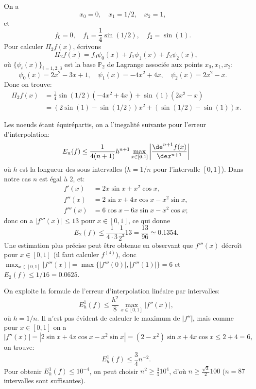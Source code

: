 \documentclass[11pt]{article}
\begin{document}
\newpage
\begin{Answer}[ref={ex:4}]
  \Question
On a
$$
x_0 = 0, \quad
x_1 = 1/2, \quad
x_2 = 1, \quad
$$
et
$$
f_0 = 0, \quad
f_1 = \frac{1}{4} \sin(1/2), \quad
f_2 = \sin(1). \quad
$$
Pour calculer $\Pi_2f(x)$, \'ecrivons
$$
\Pi_2 f(x) = f_0 \psi_0(x) + f_1 \psi_1(x) + f_2 \psi_2(x),
$$
o\`u $\{ \psi_i(x) \}_{i=1,2,3}$ est la base $\mathbb{P}_2$ de Lagrange
associ\'ee aux points $x_0, x_1, x_2$:
$$
\psi_0(x) = 2x^2 - 3x +1, \quad
\psi_1(x) = - 4x^2 + 4x, \quad
\psi_2(x) = 2x^2 - x. \quad
$$
Donc on trouve:
\begin{displaymath}
\begin{split}
\Pi_2 f(x) & = \frac{1}{4} \sin(1/2) (- 4x^2 + 4x) +
\sin(1) (2x^2 - x) \\
  & = (2 \sin(1) - \sin(1/2)) x^2 + (\sin(1/2) - \sin(1)) x.
\end{split}
\end{displaymath}

\Question
Les noeuds \'etant \'equir\'epartis, on a
l'inegalit\'e suivante pour l'erreur d'interpolation:
$$
E_n(f) \leq \frac{1}{4(n+1)} h^{n+1} \max_{x \in [0,1]} \left|
\frac{\de^{n+1} f(x)}{\de x^{n+1}} \right|
$$
o\`u $h$ est la longueur des sous-intervalles ($h= 1/n$
pour l'intervalle $[0,1]$).
Dans notre cas $n$ est \'egal \`a 2, et:
\begin{align*}
f'(x) & = 2 x \sin x + x^2 \cos x, \\
f''(x) & = 2 \sin x + 4 x \cos x - x^2 \sin x, \\
f'''(x) & = 6 \cos x - 6 x \sin x - x^2 \cos x;
\end{align*}
donc on a $|f'''(x)| \leq 13$ pour $x\in [0,1]$, ce qui donne
$$
E_2(f) \leq \frac{1}{4 \cdot 3} \frac{1}{2^3} 13 = \frac{13}{96} \simeq 0.1354.
$$
Une estimation plus pr\'ecise peut \^etre obtenue en observant que $f'''(x)$
d\'ecro\^it pour $x\in[0,1]$ (il faut calculer $f^{(4)}$), donc
$\max_{x \in [0,1]}|f'''(x)| = \max \{|f'''(0)|, |f'''(1)| \} = 6 $
et $ E_2(f) \leq 1/16 = 0.0625$.

\Question
On exploite la formule de l'erreur d'interpolation lin\'eaire
par intervalles:
$$
E^1_h(f) \leq \frac{h^2}{8} \max_{x \in[0,1]} | f''(x) |,
$$
o\`u $h = 1/n$.
Il n'est pas \'evident de calculer le maximum de
$|f''|$, mais comme pour $x\in [0,1]$ on a
$$
| f''(x) | = |2\sin x + 4x\cos x - x^2\sin x |
= (2 - x^2)\sin x + 4x \cos x \leq 2 + 4 = 6,
$$
on trouve:
$$
E^1_h(f) \leq \frac{3}{4} n^{-2}.
$$
Pour obtenir $E^1_h(f) \leq 10^{-4}$,
on peut choisir $n^2 \geq \frac{3}{4} 10^4$, d'o\`u
$n \geq \frac{\sqrt{3}}{2} 100$ ($n = 87$ intervalles
sont suffisantes).
\end{Answer}
\end{document}
